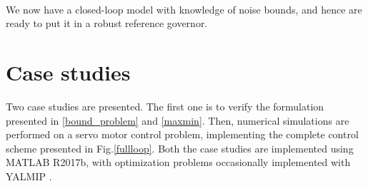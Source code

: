 \documentclass[letterpaper, 10 pt, conference]{ieeeconf}  %
\begin{document}
\begin{enumerate}
	 \\
	We now have a closed-loop model with knowledge of noise bounds, and hence are ready to put it in a robust reference governor.
	\section{Case studies}
	Two case studies are presented. The first one is to verify the formulation presented in \eqref{bound_problem} and \eqref{maxmin}. Then, numerical simulations are performed on a servo motor control problem, implementing the complete control scheme presented in Fig.\ref{fullloop}. Both the case studies are implemented using MATLAB R2017b, with optimization problems occasionally implemented with YALMIP \cite{Lofberg2004}.
	\label{Case studies}

\end{enumerate}
\end{document}
